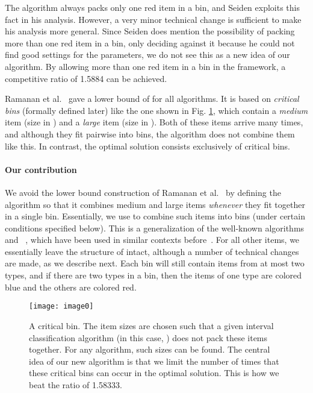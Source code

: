 The algorithm {\Hpp} always packs only one red item in a bin, and Seiden exploits this fact in his analysis. However, a very minor technical change is sufficient to make his analysis more general. Since Seiden does mention the possibility of packing more than one red item in a bin, only deciding against it because he could not find good settings for the parameters, we do not see this as a new idea of our algorithm. By allowing more than one red item in a bin in the {\SuperH} framework, a competitive ratio of 1.5884 can be achieved.

Ramanan et al.~\cite{RaBrLL89} gave a lower bound of 
for all {\SuperH} algorithms.
It is based on \emph{critical bins} (formally defined later) like the one shown in
Fig. \ref{fig:ramanan}, which contain a \emph{medium} item (size in ) and
a \emph{large} item (size in ). 
Both of these items arrive many times, and although they fit pairwise
into bins, the algorithm does not combine them like this. 
In contrast, the optimal solution consists exclusively of critical bins.


\paragraph{Our contribution}
We avoid the lower bound construction of Ramanan et al.~\cite{RaBrLL89} by defining
the algorithm so that it combines medium and large items \emph{whenever} they 
fit together in a single bin. 
Essentially, we use {\af} to combine such items into bins (under certain
conditions specified below). This is a generalization of the well-known
algorithms {\ff} and {\bfit}~\cite{Ullman71,GaGrUl72}, which have been used in similar 
contexts before~\cite{babdss15,BaChKK04}. 
For all other items, we essentially leave the structure of {\SuperH} intact, although a number of technical changes are made, as we describe next.
Each bin will still contain items from at most two types, and if there are two types in a bin, then the items of one type are colored blue and the others are colored red.

\begin{figure}\begin{center}
		\texttt{[image: image0]}
		\caption{\label{fig:ramanan}A critical bin.
			The item sizes are chosen such that a given interval classification algorithm 
			(in this case, {\Hpp}) does not pack these items together. For any \SuperH{} algorithm, such sizes can be found.
			The central idea of our new algorithm is that we limit the number of times that these critical bins can occur in the optimal solution.
			This is how we beat the ratio of 1.58333.
		}
	\end{center}
\end{figure}

